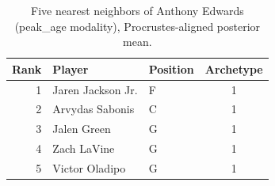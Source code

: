 \begin{table}[htbp]
  \centering\small
  \begin{tabular}{rllc}
    \toprule
    Rank & Player & Position & Archetype \\
    \midrule
    1 & Jaren Jackson Jr. & F & 1 \\
    2 & Arvydas Sabonis & C & 1 \\
    3 & Jalen Green & G & 1 \\
    4 & Zach LaVine & G & 1 \\
    5 & Victor Oladipo & G & 1 \\
    \bottomrule
  \end{tabular}
  \caption{Five nearest neighbors of Anthony Edwards (peak_age modality), Procrustes-aligned posterior mean.}
  \label{tab:Anthony_Edwards_neighbors_peak_age}
\end{table}


